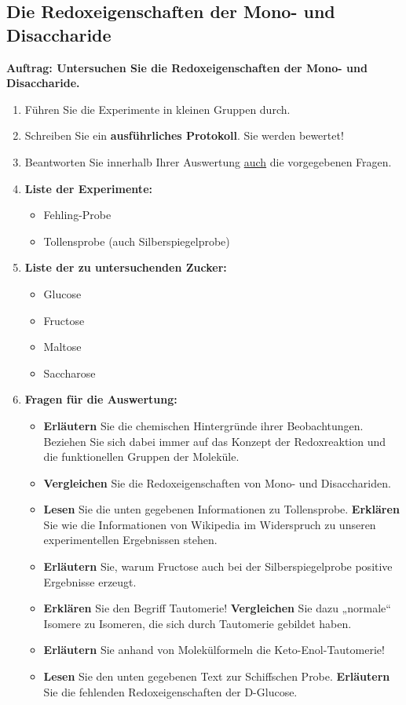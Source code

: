 \documentclass{scrartcl}  %
\begin{document}
		\subsection{Die Redoxeigenschaften der Mono- und Disaccharide}
			\textbf{Auftrag: Untersuchen Sie die Redoxeigenschaften der Mono- und Disaccharide.}
			\begin{enumerate}
				\item Führen Sie die Experimente in kleinen Gruppen durch.
				\item Schreiben Sie ein \textbf{ausführliches Protokoll}. Sie werden bewertet! 
				\item Beantworten Sie innerhalb Ihrer Auswertung \underline{auch} die vorgegebenen Fragen.
				\item \textbf{Liste der Experimente:}
				\begin{itemize}
					\item Fehling-Probe
					\item Tollensprobe (auch Silberspiegelprobe)
				\end{itemize}
				\item \textbf{Liste der zu untersuchenden Zucker:}
				\begin{itemize}
					\item Glucose
					\item Fructose
					\item Maltose
					\item Saccharose
				\end{itemize}
				\item \textbf{Fragen für die Auswertung:}
				\begin{itemize}
					\item \textbf{Erläutern} Sie die chemischen Hintergründe ihrer Beobachtungen. Beziehen Sie sich dabei immer auf das Konzept der Redoxreaktion und die funktionellen Gruppen der Moleküle.
					\item \textbf{Vergleichen} Sie die Redoxeigenschaften von Mono- und Disacchariden.
					\item \textbf{Lesen} Sie die unten gegebenen Informationen zu Tollensprobe. \textbf{Erklären} Sie wie die Informationen von Wikipedia im Widerspruch zu unseren experimentellen Ergebnissen stehen. 
			        \item \textbf{Erläutern} Sie, warum Fructose auch bei der Silberspiegelprobe positive Ergebnisse erzeugt.
			        \item \textbf{Erklären} Sie den Begriff Tautomerie! \textbf{Vergleichen} Sie dazu „normale“ Isomere zu Isomeren, die sich durch Tautomerie gebildet haben.
			        \item \textbf{Erläutern} Sie anhand von Molekülformeln die Keto-Enol-Tautomerie!
			        \item \textbf{Lesen} Sie den unten gegebenen Text zur Schiffschen Probe. \textbf{Erläutern} Sie die fehlenden Redoxeigenschaften der D-Glucose.
				\end{itemize}
			\end{enumerate}
\end{document}
